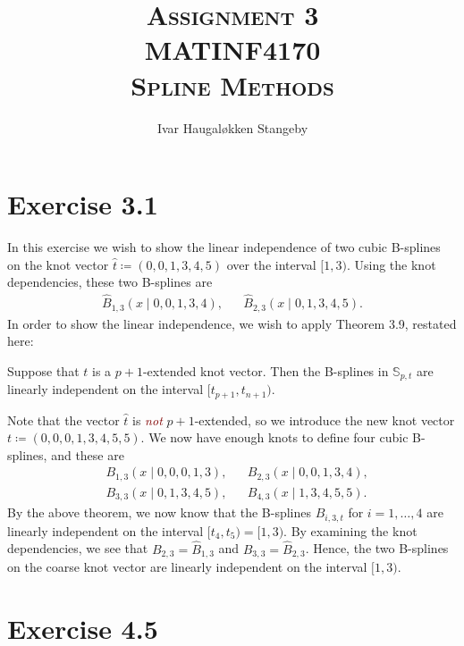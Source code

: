 \documentclass{article}
\title{\textsc{Assignment 3 \\
       MATINF4170 \\
       Spline Methods}
}
\author{Ivar Haugal{\o}kken Stangeby}
\renewcommand{\S}{\mathbb{S}}
\let\oldemph\emph
\renewcommand{\emph}[1]{\textcolor{Maroon}{\oldemph{#1}}}
\begin{document}
    \maketitle 

    \section*{Exercise 3.1}
    
    In this exercise we wish to show the linear independence of two cubic
    B-splines on the knot vector $\hat{t} \coloneqq (0, 0, 1, 3, 4, 5)$ over
    the interval $[1, 3)$. Using the knot dependencies, these two B-splines are
    \begin{align*}
        \hat{B}_{1, 3}(x \mid 0, 0, 1, 3, 4), && \hat{B}_{2, 3}(x \mid 0, 1, 3,
        4, 5).
    \end{align*}
    In order to show the linear independence, we wish to apply Theorem 3.9,
    restated here:
    
    \begin{theorem}[3.9]
        Suppose that $t$ is a $p + 1$-extended knot vector. Then the B-splines
        in $\S_{p, t}$ are linearly independent on the interval $[t_{p+1},
        t_{n+1})$.
    \end{theorem}
    
    Note that the vector $\hat{t}$ is \emph{not} $p+1$-extended, so we
    introduce the new knot vector $t \coloneqq (0, 0, 0, 1, 3, 4, 5, 5)$.  We
    now have enough knots to define four cubic B-splines, and these are
    \begin{align*}
        &B_{1, 3}(x \mid 0, 0, 0, 1, 3), & &B_{2, 3}(x \mid 0, 0, 1, 3, 4), \\
        &B_{3, 3}(x \mid 0, 1, 3, 4, 5), & &B_{4, 3}(x \mid 1, 3, 4, 5, 5).
    \end{align*}
    By the above theorem, we now know that the B-splines $B_{i, 3, t}$ for $i =
    1, \ldots, 4$ are linearly independent on the interval $[t_{4}, t_{5}) =
    [1, 3)$.  By examining the knot dependencies, we see that $B_{2, 3} =
    \hat{B}_{1, 3}$ and $B_{3, 3} = \hat{B}_{2, 3}$. Hence, the two B-splines
    on the coarse knot vector are linearly independent on the interval $[1,
    3)$.
    
    \section*{Exercise 4.5}
    
\end{document}
